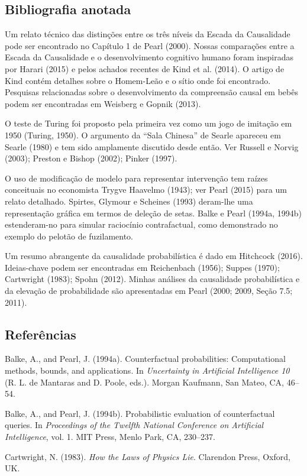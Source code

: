 \documentclass[11pt,a5paper,twoside]{book}
\begin{document}
\subsection{Bibliografia anotada}
Um relato técnico das distinções entre os três níveis da Escada da Causalidade pode ser encontrado no Capítulo 1 de Pearl (2000). Nossas comparações entre a Escada da Causalidade e o desenvolvimento cognitivo humano foram inspiradas por Harari (2015) e pelos achados recentes de Kind et al. (2014). O artigo de Kind contém detalhes sobre o Homem-Leão e o sítio onde foi encontrado. Pesquisas relacionadas sobre o desenvolvimento da compreensão causal em bebês podem ser encontradas em Weisberg e Gopnik (2013).

O teste de Turing foi proposto pela primeira vez como um jogo de imitação em 1950 (Turing, 1950). O argumento da “Sala Chinesa” de Searle apareceu em Searle (1980) e tem sido amplamente discutido desde então. Ver Russell e Norvig (2003); Preston e Bishop (2002); Pinker (1997).

O uso de modificação de modelo para representar intervenção tem raízes conceituais no economista Trygve Haavelmo (1943); ver Pearl (2015) para um relato detalhado. Spirtes, Glymour e Scheines (1993) deram-lhe uma representação gráfica em termos de deleção de setas. Balke e Pearl (1994a, 1994b) estenderam-no para simular raciocínio contrafactual, como demonstrado no exemplo do pelotão de fuzilamento.

Um resumo abrangente da causalidade probabilística é dado em Hitchcock (2016). Ideias-chave podem ser encontradas em Reichenbach (1956); Suppes (1970); Cartwright (1983); Spohn (2012). Minhas análises da causalidade probabilística e da elevação de probabilidade são apresentadas em Pearl (2000; 2009, Seção 7.5; 2011).

\subsection{Referências}
Balke, A., and Pearl, J. (1994a). Counterfactual probabilities: Computational methods, bounds, and applications. In \textit{Uncertainty in Artificial Intelligence 10} (R. L. de Mantaras and D. Poole, eds.). Morgan Kaufmann, San Mateo, CA, 46–54.

Balke, A., and Pearl, J. (1994b). Probabilistic evaluation of counterfactual queries. In \textit{Proceedings of the Twelfth National Conference on Artificial Intelligence}, vol. 1. MIT Press, Menlo Park, CA, 230–237.

Cartwright, N. (1983). \textit{How the Laws of Physics Lie}. Clarendon Press, Oxford, UK.
\end{document}
